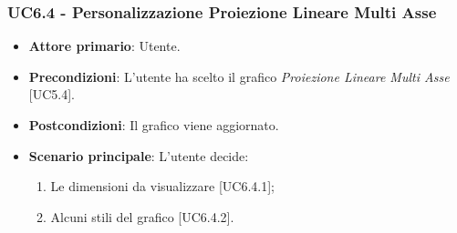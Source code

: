 \subsubsection{UC6.4 - Personalizzazione Proiezione Lineare Multi Asse}
\begin{itemize}
	\item \textbf{Attore primario}: Utente.
	
	\item \textbf{Precondizioni}: L'utente ha scelto il grafico \textit{Proiezione Lineare Multi Asse} [UC5.4].
	
	\item \textbf{Postcondizioni}: Il grafico viene aggiornato.
	
	\item \textbf{Scenario principale}: L'utente decide:
	
\begin{enumerate}
\item Le dimensioni da visualizzare [UC6.4.1];
\item Alcuni stili del grafico [UC6.4.2].
\end{enumerate}	
		
\end{itemize}